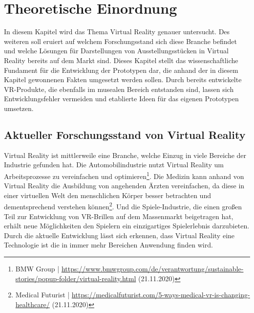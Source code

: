 \documentclass[a4paper,12pt,oneside]{article}
\begin{document}
  \section{Theoretische Einordnung}
    In diesem Kapitel wird das Thema Virtual Reality genauer untersucht. Des weiteren
    soll eruiert
    auf welchem
    Forschungsstand sich diese Branche befindet und welche Lösungen für Darstellungen
    von Ausstellungsstücken in Virtual Reality bereits auf 
    dem Markt sind. Dieses Kapitel stellt das
    wissenschaftliche Fundament für die Entwicklung der Prototypen dar, die anhand der in
    diesem Kapitel gewonnenen Fakten umgesetzt werden sollen.
    Durch bereits entwickelte VR-Produkte, die ebenfalls im musealen Bereich entstanden sind,
    lassen sich Entwicklungsfehler vermeiden und etablierte Ideen für das eigenen
    Prototypen umsetzen.
    \subsection{Aktueller Forschungsstand von Virtual Reality}
      Virtual Reality ist mittlerweile eine Branche, welche Einzug in viele Bereiche der
      Industrie gefunden hat. Die Automobilindustrie nutzt Virtual Reality um Arbeitsprozesse
      zu vereinfachen und optimieren\footnote{BMW Group | \url{https://www.bmwgroup.com/de/verantwortung/sustainable-stories/popup-folder/virtual-reality.html} (21.11.2020)}. 
      Die Medizin kann anhand von Virtual Reality die
      Ausbildung von angehenden Ärzten vereinfachen, da diese in einer virtuellen Welt
      den menschlichen Körper besser betrachten und dementsprechend verstehen können\footnote{Medical Futurist | \url{https://medicalfuturist.com/5-ways-medical-vr-is-changing-healthcare/} (21.11.2020)}. 
      Und die Spiele-Industrie, die einen großen Teil zur Entwicklung von
      VR-Brillen auf dem Massenmarkt beigetragen hat, erhält neue Möglichkeiten 
      den Spielern ein einzigartiges Spielerlebnis darzubieten. Durch die aktuelle
      Entwicklung lässt sich erkennen, dass Virtual Reality eine Technologie ist die
      in immer mehr Bereichen Anwendung finden wird.
\end{document}
